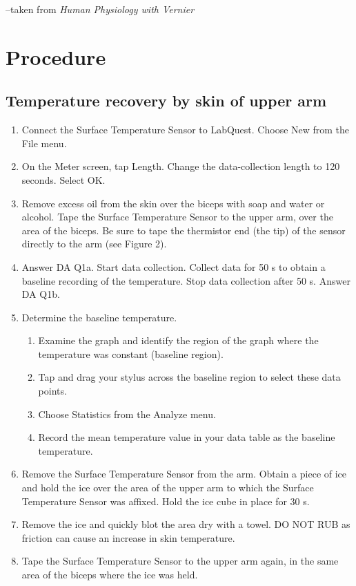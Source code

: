 \documentclass[12pt,oneside]{article}
\begin{document}
--taken from \textit{Human Physiology with Vernier}

\section{Procedure}
\subsection{Temperature recovery by skin of upper arm}
\begin{enumerate}
\item	Connect the Surface Temperature Sensor to LabQuest. Choose New from the File menu.
\item	On the Meter screen, tap Length. Change the data-collection length to 120 seconds. Select OK.
\item	Remove excess oil from the skin over the biceps with soap and water or alcohol. Tape the Surface Temperature Sensor to the upper arm, over the area of the biceps. Be sure to tape the thermistor end (the tip) of the sensor directly to the arm (see Figure 2). 
\item	Answer DA Q1a. Start data collection. Collect data for 50 s to obtain a baseline recording of the temperature. Stop data collection after 50 s. Answer DA Q1b.
\item	Determine the baseline temperature.
\begin{enumerate}
\item	Examine the graph and identify the region of the graph where the temperature was constant (baseline region).
\item	Tap and drag your stylus across the baseline region to select these data points.
\item	Choose Statistics from the Analyze menu.
\item	Record the mean temperature value in your data table as the baseline temperature. 
\end{enumerate}
\item	Remove the Surface Temperature Sensor from the arm. Obtain a piece of ice and hold the ice over the area of the upper arm to which the Surface Temperature Sensor was affixed. Hold the ice cube in place for 30 s.
\item	Remove the ice and quickly blot the area dry with a towel. DO NOT RUB as friction can cause an increase in skin temperature. 
\item	Tape the Surface Temperature Sensor to the upper arm again, in the same area of the biceps where the ice was held. 

\end{enumerate}
\end{document}
